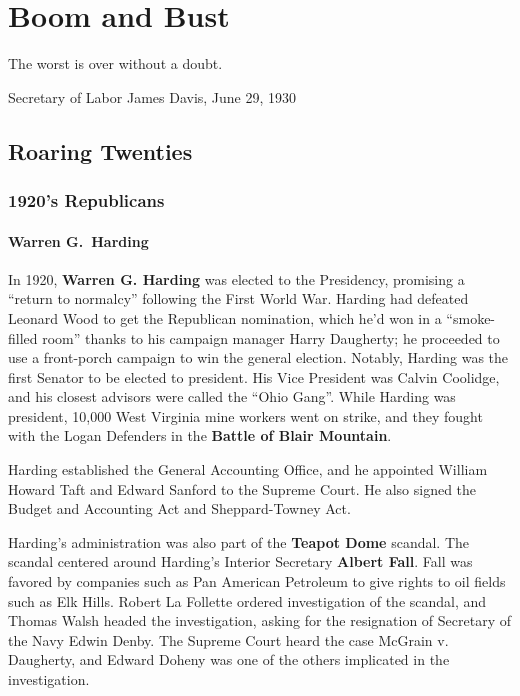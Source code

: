 \chapter{Boom and Bust}

\epigraph{%
  The worst is over without a doubt.
}{Secretary of Labor James Davis, June 29, 1930}

\section{Roaring Twenties}

\subsection*{1920's Republicans}

\subsubsection*{Warren G.\ Harding}

In 1920, \textbf{Warren G. Harding} was elected to the Presidency,
promising a ``return to normalcy'' following the First World War.
Harding had defeated Leonard Wood to get the Republican nomination,
which he'd won in a ``smoke-filled room'' thanks to his campaign manager Harry Daugherty;
he proceeded to use a front-porch campaign to win the general election.
Notably, Harding was the first Senator to be elected to president.
His Vice President was Calvin Coolidge, and his closest advisors were called the ``Ohio Gang''.
While Harding was president, 10,000 West Virginia mine workers went on strike,
and they fought with the Logan Defenders in the \textbf{Battle of Blair Mountain}.

Harding established the General Accounting Office,
and he appointed William Howard Taft and Edward Sanford to the Supreme Court.
He also signed the Budget and Accounting Act and Sheppard-Towney Act.

Harding's administration was also part of the \textbf{Teapot Dome} scandal.
The scandal centered around Harding's Interior Secretary \textbf{Albert Fall}.
Fall was favored by companies such as Pan American Petroleum to give rights to oil fields such as Elk Hills.
Robert La Follette ordered investigation of the scandal,
and Thomas Walsh headed the investigation, asking for the resignation of Secretary of the Navy Edwin Denby.
The Supreme Court heard the case McGrain v. Daugherty,
and Edward Doheny was one of the others implicated in the investigation.


